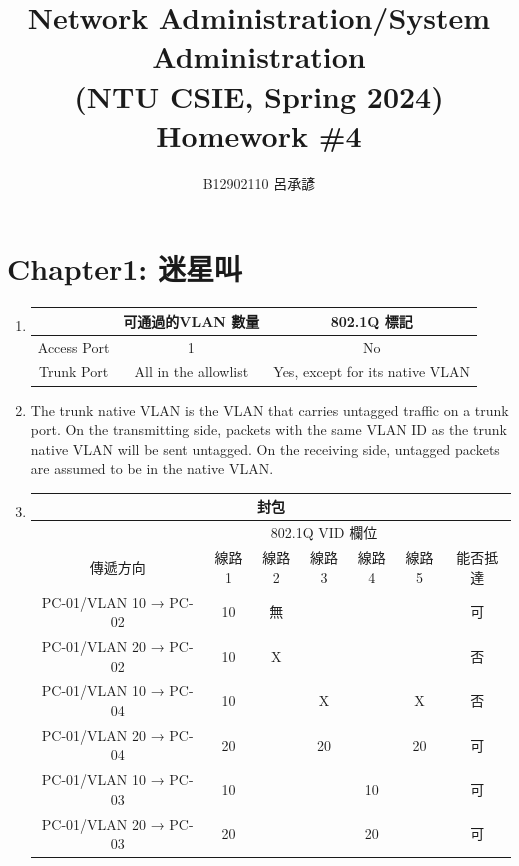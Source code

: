 \documentclass[12pt, a4paper]{article}
\title{
  Network Administration/System Administration\\
  (NTU CSIE, Spring 2024)\\
  Homework \#4
}
\author{\Large B12902110 呂承諺}
\begin{document}
  \maketitle
  \section*{Chapter1: 迷星叫}
  \begin{enumerate}
     \item\phantom{}\vspace{-\baselineskip}

     \begin{tabular}{|c|c|c|}
       \hline
       & 可通過的VLAN 數量 & 802.1Q 標記 \\\hline
       Access Port & 1 & No \\\hline
       Trunk Port & All in the allowlist & Yes, except for its native VLAN \\\hline
     \end{tabular}

     \item The trunk native VLAN is the VLAN that carries untagged traffic on a
     trunk port. On the transmitting side, packets with the same VLAN ID as the
     trunk native VLAN will be sent untagged. On the receiving side, untagged
     packets are assumed to be in the native VLAN.

     \item\phantom{}\vspace{-\baselineskip}

     \begin{tabular}{|c|c|c|c|c|c|c|}
       \hline
       \multicolumn{7}{|c|}{封包}\\\hline
       & \multicolumn{5}{c|}{802.1Q VID 欄位} & \\\hline
       傳遞方向 & 線路1 & 線路2 & 線路3 & 線路4 & 線路5 & 能否抵達 \\\hline
       PC-01/VLAN 10 → PC-02 & 10 & 無 & \cellcolor{gray} & \cellcolor{gray} & \cellcolor{gray} & 可 \\\hline
       PC-01/VLAN 20 → PC-02 & 10 & X & \cellcolor{gray} & \cellcolor{gray} & \cellcolor{gray} & 否 \\\hline
       PC-01/VLAN 10 → PC-04 & 10 & \cellcolor{gray} & X & \cellcolor{gray} & X & 否\\\hline
       PC-01/VLAN 20 → PC-04 & 20 & \cellcolor{gray} & 20 & \cellcolor{gray} & 20 & 可\\\hline
       PC-01/VLAN 10 → PC-03 & 10 & \cellcolor{gray} & \cellcolor{gray} & 10 & \cellcolor{gray} & 可 \\\hline
       PC-01/VLAN 20 → PC-03 & 20 & \cellcolor{gray} & \cellcolor{gray} & 20 & \cellcolor{gray} & 可 \\\hline
     \end{tabular}


\end{enumerate}
\end{document}
